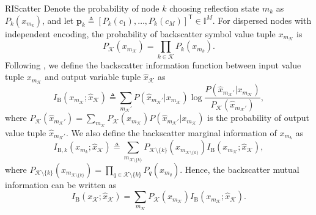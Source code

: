 \documentclass[journal,12pt,onecolumn,draftclsnofoot]{IEEEtran}
\theoremstyle{remark}
\begin{document}
\begin{section}{RIScatter}
	Denote the probability of node $k$ choosing reflection state $m_k$ as $P_k(x_{m_k})$, and let $\boldsymbol{p}_k \triangleq [P_k(c_1),\ldots,P_k(c_M)]^\mathsf{T} \in \mathbb{I}^{M}$.
	For dispersed nodes with independent encoding, the probability of backscatter symbol value tuple $x_{m_{\mathcal{K}}}$ is
	\begin{equation}
		P_{\mathcal{K}}(x_{m_{\mathcal{K}}}) = \prod_{k \in \mathcal{K}} P_k(x_{m_k}).
		\label{eq:equivalent_distribution}
	\end{equation}
	Following \cite{Rezaeian2004}, we define the backscatter information function between input value tuple $x_{m_{\mathcal{K}}}$ and output variable tuple $\hat{x}_{\mathcal{K}}$ as
	\begin{equation}
		I_{\text{B}}(x_{m_{\mathcal{K}}};\hat{x}_{\mathcal{K}}) \triangleq \sum_{m_{\mathcal{K}}'} P(\hat{x}_{m_{\mathcal{K}}'}|x_{m_{\mathcal{K}}}) \log \frac{P(\hat{x}_{m_{\mathcal{K}}'}|x_{m_{\mathcal{K}}})}{P_{\mathcal{K}}(\hat{x}_{m_{\mathcal{K}}'})},
		\label{eq:backscatter_information_function}
	\end{equation}
	where $P_{\mathcal{K}}(\hat{x}_{m_{\mathcal{K}}'}) = \sum_{m_{\mathcal{K}}} P_{\mathcal{K}}(x_{m_{\mathcal{K}}}) P(\hat{x}_{m_{\mathcal{K}}'}|x_{m_{\mathcal{K}}})$ is the probability of output value tuple $\hat{x}_{m_{\mathcal{K}}'}$.
	We also define the backscatter marginal information of $x_{m_k}$ as
	\begin{equation}
		I_{\text{B},k}(x_{m_k};\hat{x}_{\mathcal{K}}) \triangleq \sum_{m_{\mathcal{K} \setminus \{k\}}} P_{\mathcal{K} \setminus \{k\}}(x_{m_{\mathcal{K} \setminus \{k\}}}) I_{\text{B}}(x_{m_{\mathcal{K}}};\hat{x}_{\mathcal{K}}),
		\label{eq:backscatter_marginal_information}
	\end{equation}
	where $P_{\mathcal{K} \setminus \{k\}}(x_{m_{\mathcal{K} \setminus \{k\}}}) = \prod_{q \in \mathcal{K} \setminus \{k\}} P_{q}(x_{m_{q}})$.
	Hence, the backscatter mutual information can be written as
	\begin{equation}
		I_{\text{B}}(x_{\mathcal{K}};\hat{x}_{\mathcal{K}}) = \sum_{m_{\mathcal{K}}} P_{\mathcal{K}}(x_{m_{\mathcal{K}}}) I_{\text{B}}(x_{m_{\mathcal{K}}};\hat{x}_{\mathcal{K}}).
		\label{eq:backscatter_mutual_information}
	\end{equation}


\end{section}
\end{document}
